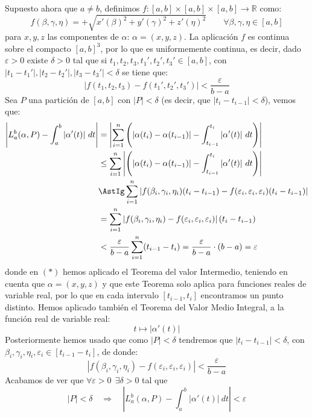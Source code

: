 \noindent
Supuesto ahora que $a\neq b$, definimos $f:[a,b]\times [a,b]\times [a,b] \to \mathbb{R}$ como:
\begin{equation*}
    f(\beta,\gamma,\eta) = +\sqrt{x'(\beta)^2 + y'(\gamma)^2 + z'(\eta)^2} \qquad \forall \beta,\gamma,\eta\in [a,b]
\end{equation*}
para $x,y,z$ las componentes de $\alpha$: $\alpha = (x,y,z)$. La aplicación $f$ es continua sobre el compacto $[a,b]^3$, por lo que es uniformemente continua, es decir, dado $\varepsilon>0$ existe $\delta>0$ tal que si $t_1,t_2,t_3,t_1',t_2',t_3'\in [a,b]$, con $|t_1-t_1'|, |t_2-t_2'|, |t_3-t_3'| < \delta$ se tiene que:
\begin{equation*}
    |f(t_1,t_2,t_3) - f(t_1',t_2',t_3')| < \frac{\varepsilon}{b-a}
\end{equation*}
Sea $P$ una partición de $[a,b]$ con $|P|< \delta$ (es decir, que $|t_i - t_{i-1}| < \delta$), vemos que:
\begin{align*}
    \left|L_a^b(\alpha,P) - \int_{a}^{b} |\alpha'(t)|~dt \right| &= \left|\sum_{i=1}^{n}\left(|\alpha(t_i)-\alpha(t_{i-1})| - \int_{t_{i-1}}^{t_i} |\alpha'(t)|~dt\right) \right|  \\
                                                          &\leq \sum_{i=1}^{n} \left|\left(|\alpha(t_i)-\alpha(t_{i-1})|- \int_{t_{i-1}}^{t_i} |\alpha'(t)|~dt \right)\right| \\
                                                          &\AstIg \sum_{i=1}^{n}\left|f(\beta_i,\gamma_i,\eta_i)(t_i-t_{i-1}) - f(\varepsilon_i,\varepsilon_i,\varepsilon_i)(t_{i}-t_{i-1})\right| \\
                                                          &= \sum_{i=1}^{n} \left|f(\beta_i,\gamma_i,\eta_i)-f(\varepsilon_i,\varepsilon_i,\varepsilon_i)\right|(t_i - t_{i-1}) \\
                                                          &< \frac{\varepsilon}{b-a}\sum_{i=1}^{n} (t_{i-1}-t_i) = \frac{\varepsilon}{b-a}\cdot (b-a) = \varepsilon
\end{align*}
donde en $(\ast)$ hemos aplicado el Teorema del valor Intermedio, teniendo en cuenta que $\alpha=(x,y,z)$ y que este Teorema solo aplica para funciones reales de variable real, por lo que en cada intervalo $[t_{i-1},t_i]$ encontramos un punto distinto. Hemos aplicado también el Teorema del Valor Medio Integral, a la función real de variable real:
\begin{equation*}
    t\longmapsto |\alpha'(t)|
\end{equation*}
Posteriormente hemos usado que como $|P|<\delta$ tendremos que $|t_{i}-t_{i-1}|<\delta$, con $\beta_i,\gamma_i,\eta_i,\varepsilon_i \in [t_{i-1}-t_i]$, de donde:
\begin{equation*}
    |f(\beta_i,\gamma_i,\eta_i)-f(\varepsilon_i,\varepsilon_i,\varepsilon_i)| < \frac{\varepsilon}{b-a}
\end{equation*}
Acabamos de ver que $\forall \varepsilon>0~~\exists \delta>0$ tal que
\begin{equation*}
    |P| < \delta \quad\Longrightarrow\quad \left|L_a^b(\alpha,P)-\int_{a}^{b} |\alpha'(t)|~dt \right| < \varepsilon
\end{equation*}

